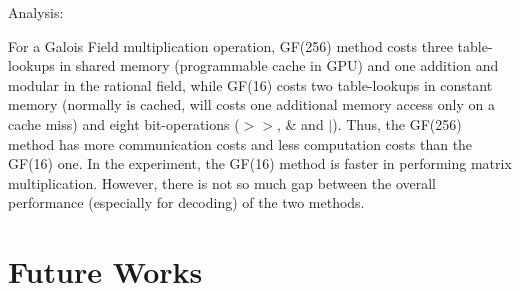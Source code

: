 \documentclass[a4paper]{article}
\begin{document}
Analysis:

For a Galois Field multiplication operation, GF(256) method costs three table-lookups in shared memory (programmable cache in GPU) and one addition and modular in the rational field, while GF(16) costs two table-lookups in constant memory (normally is cached, will costs one additional memory access only on a cache miss) and eight bit-operations ($>>$, $\&$ and $|$).
Thus, the GF(256) method has more communication costs and less computation costs than the GF(16) one.
In the experiment, the GF(16) method is faster in performing matrix multiplication.
However, there is not so much gap between the overall performance (especially for decoding) of the two methods.

\section{Future Works}
\end{document}
